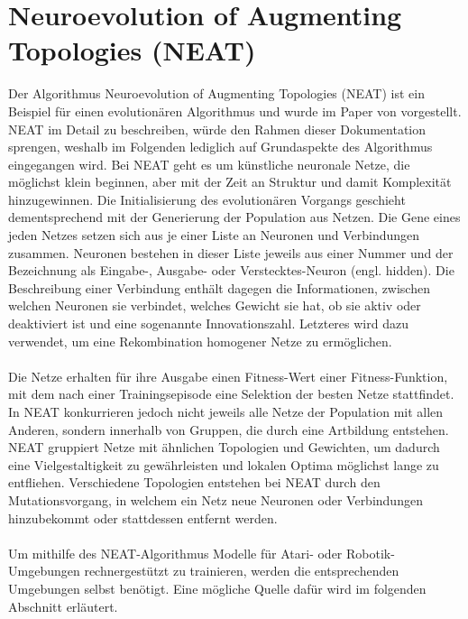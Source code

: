 \section{Neuroevolution of Augmenting Topologies (NEAT)}
\label{sec:FirstContent:SecondSection}
Der Algorithmus Neuroevolution of Augmenting Topologies (NEAT) ist ein Beispiel für einen evolutionären Algorithmus und wurde im Paper von \cite{stanley2002} vorgestellt. NEAT im Detail zu beschreiben, würde den Rahmen dieser Dokumentation sprengen, weshalb im Folgenden lediglich auf Grundaspekte des Algorithmus eingegangen wird. Bei NEAT geht es um künstliche neuronale Netze, die möglichst klein beginnen, aber mit der Zeit an Struktur und damit Komplexität hinzugewinnen. Die Initialisierung des evolutionären Vorgangs geschieht dementsprechend mit der Generierung der Population aus Netzen. Die Gene eines jeden Netzes setzen sich aus je einer Liste an Neuronen und Verbindungen zusammen. Neuronen bestehen in dieser Liste jeweils aus einer Nummer und der Bezeichnung als Eingabe-, Ausgabe- oder Verstecktes-Neuron (engl. hidden). Die Beschreibung einer Verbindung enthält dagegen die Informationen, zwischen welchen Neuronen sie verbindet, welches Gewicht sie hat, ob sie aktiv oder deaktiviert ist und eine sogenannte Innovationszahl. Letzteres wird dazu verwendet, um eine Rekombination homogener Netze zu ermöglichen.
\\\\
Die Netze erhalten für ihre Ausgabe einen Fitness-Wert einer Fitness-Funktion, mit dem nach einer Trainingsepisode eine Selektion der besten Netze stattfindet. In NEAT konkurrieren jedoch nicht jeweils alle Netze der Population mit allen Anderen, sondern innerhalb von Gruppen, die durch eine Artbildung entstehen. NEAT gruppiert Netze mit ähnlichen Topologien und Gewichten, um dadurch eine Vielgestaltigkeit zu gewährleisten und lokalen Optima möglichst lange zu entfliehen. Verschiedene Topologien entstehen bei NEAT durch den Mutationsvorgang, in welchem ein Netz neue Neuronen oder Verbindungen hinzubekommt oder stattdessen entfernt werden.
\\\\
Um mithilfe des NEAT-Algorithmus Modelle für Atari- oder Robotik-Umgebungen rechnergestützt zu trainieren, werden die entsprechenden Umgebungen selbst benötigt. Eine mögliche Quelle dafür wird im folgenden Abschnitt erläutert.
